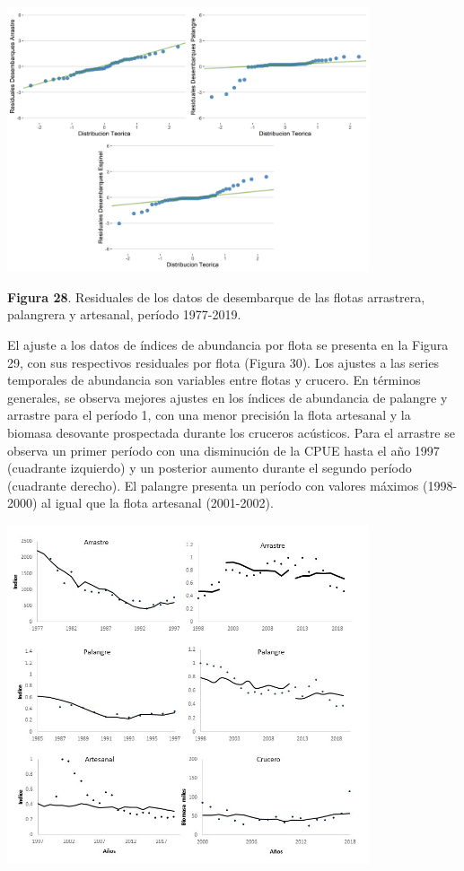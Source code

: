 \documentclass[
  spanish,
]{article}
\begin{document}
\begin{center}
\includegraphics[width=0.8\textwidth]{Figuras/resid.yield.png}
\end{center}

\small \textbf{Figura 28}. Residuales de los datos de desembarque de las
flotas arrastrera, palangrera y artesanal, período 1977-2019.
\vspace{0.5cm} \normalsize

El ajuste a los datos de índices de abundancia por flota se presenta en
la Figura 29, con sus respectivos residuales por flota (Figura 30). Los
ajustes a las series temporales de abundancia son variables entre flotas
y crucero. En términos generales, se observa mejores ajustes en los
índices de abundancia de palangre y arrastre para el período 1, con una
menor precisión la flota artesanal y la biomasa desovante prospectada
durante los cruceros acústicos. Para el arrastre se observa un primer
período con una disminución de la CPUE hasta el año 1997 (cuadrante
izquierdo) y un posterior aumento durante el segundo período (cuadrante
derecho). El palangre presenta un período con valores máximos
(1998-2000) al igual que la flota artesanal (2001-2002).

\begin{center}
\includegraphics[width=0.8\textwidth]{Figuras/ajustes.png}
\end{center}
\end{document}
